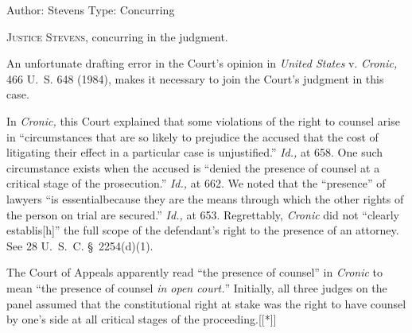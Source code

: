 Author: Stevens
\setcounter{page}{126}
Type: Concurring

  \textsc{Justice Stevens,} concurring in the judgment.

  An unfortunate drafting error in the Court's opinion in \emph{United States} v. \emph{Cronic,} 466 U.~S. 648 (1984), makes it necessary to join the Court's judgment in this case.

  In \emph{Cronic,} this Court explained that some violations of the right to counsel arise in ``circumstances that are so likely to prejudice the accused that the cost of litigating their effect in a particular case is unjustified.'' \emph{Id.,} at 658. One such circumstance exists when the accused is ``denied the presence of counsel at a critical stage of the prosecution.'' \emph{Id.,} at 662. We noted that the ``presence'' of lawyers ``is essential\newpage because they are the means through which the other rights of the person on trial are secured.'' \emph{Id.,} at 653. Regrettably, \emph{Cronic} did not ``clearly establis[h]'' the full scope of the defendant's right to the presence of an attorney. See 28 U.~S.~C. \S~2254(d)(1).

  The Court of Appeals apparently read ``the presence of counsel'' in \emph{Cronic} to mean ``the presence of counsel \emph{in open court.}'' Initially, all three judges on the panel assumed that the constitutional right at stake was the right to have counsel by one's side at all critical stages of the proceeding.[[*]]

